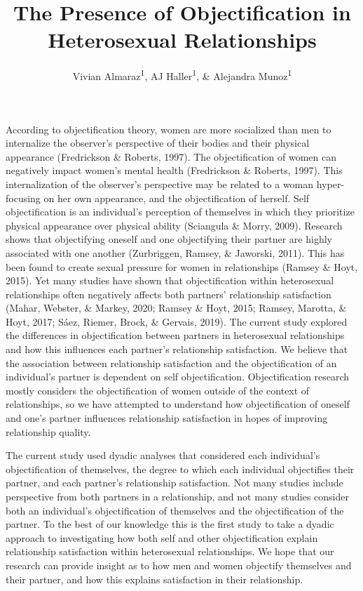 \documentclass[
  man]{apa6}
\title{The Presence of Objectification in Heterosexual Relationships}
\author{Vivian Almaraz\textsuperscript{1}, AJ Haller\textsuperscript{1}, \& Alejandra Munoz\textsuperscript{1}}
\date{}
\affiliation{\vspace{0.5cm}\textsuperscript{1} Smith College}
\begin{document}
\maketitle

According to objectification theory, women are more socialized than men to internalize the observer's perspective of their bodies and their physical appearance (Fredrickson \& Roberts, 1997). The objectification of women can negatively impact women's mental health (Fredrickson \& Roberts, 1997). This internalization of the observer's perspective may be related to a woman hyper-focusing on her own appearance, and the objectification of herself. Self objectification is an individual's perception of themselves in which they prioritize physical appearance over physical ability (Sciangula \& Morry, 2009). Research shows that objectifying oneself and one objectifying their partner are highly associated with one another (Zurbriggen, Ramsey, \& Jaworski, 2011). This has been found to create sexual pressure for women in relationships (Ramsey \& Hoyt, 2015). Yet many studies have shown that objectification within heterosexual relationships often negatively affects both partners' relationship satisfaction (Mahar, Webster, \& Markey, 2020; Ramsey \& Hoyt, 2015; Ramsey, Marotta, \& Hoyt, 2017; Sáez, Riemer, Brock, \& Gervais, 2019). The current study explored the differences in objectification between partners in heterosexual relationships and how this influences each partner's relationship satisfaction. We believe that the association between relationship satisfaction and the objectification of an individual's partner is dependent on self objectification. Objectification research mostly considers the objectification of women outside of the context of relationships, so we have attempted to understand how objectification of oneself and one's partner influences relationship satisfaction in hopes of improving relationship quality.

The current study used dyadic analyses that considered each individual's objectification of themselves, the degree to which each individual objectifies their partner, and each partner's relationship satisfaction. Not many studies include perspective from both partners in a relationship, and not many studies consider both an individual's objectification of themselves and the objectification of the partner. To the best of our knowledge this is the first study to take a dyadic approach to investigating how both self and other objectification explain relationship satisfaction within heterosexual relationships. We hope that our research can provide insight as to how men and women objectify themselves and their partner, and how this explains satisfaction in their relationship.
\end{document}

